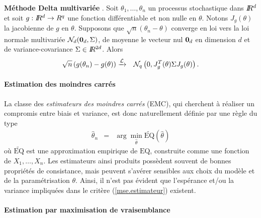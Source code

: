 \begin{theorem}{\bf M\'ethode Delta multivari\'ee}\label{delta.method} \cite{Oehlert1992}. 
Soit $\theta_1,\ldots,\theta_n$ un processus stochastique dans $I\!\!R^d$ et soit $g:I\!\!R^d\to R^q$ une fonction diff\'erentiable et non nulle en $\theta$. Notons $J_g(\theta)$ la jacobienne de $g$ en $\theta$. Supposons que $\sqrt{n}(\theta_n-\theta)$ converge en loi vers la loi normale multivari\'ee  ${\cal{N}}_d({\bf 0}_d,\Sigma)$, de moyenne le vecteur nul ${\bf 0}_d$ en dimension $d$ et de variance-covariance $\Sigma\in I\!\!R^{2d}$. Alors
\begin{eqnarray*}
\sqrt{n}\left(g(\theta_n)-g(\theta)\right) & \xrightarrow{{\cal{L}}} & {\cal{N}}_q\left(0, J^T_g(\theta)\Sigma J_g(\theta)\right).
\end{eqnarray*}
\end{theorem}

\paragraph{Estimation des moindres carr\'es}\label{estimateur.MC}

La classe des {\it estimateurs des moindres carr\'es} (EMC),  qui cherchent \`a r\'ealiser un compromis entre biais et variance, est donc naturellement d\'efinie par une r\`egle du type 
\begin{eqnarray}
\hat{\theta}_n & = & \arg\min_{\hat{\theta}} \widetilde{\mbox{EQ}}(\hat{\theta}) \label{mse.estimateur}
\end{eqnarray}
o\`u $\widetilde{\mbox{EQ}}$ est une approximation empirique de $\mbox{EQ}$, construite comme une fonction de $X_1,\ldots,X_n$. Les estimateurs ainsi produits poss\`edent souvent de bonnes propri\'et\'es de consistance, mais peuvent s'av\'erer sensibles aux choix du mod\`ele et de la param\'etrisation $\theta$. Ainsi, il n'est pas \'evident que l'esp\'erance et/ou la variance impliqu\'ees dans le crit\`ere (\ref{mse.estimateur}) existent. \\

\paragraph{Estimation par maximisation de vraisemblance}\label{estimation.MV}

